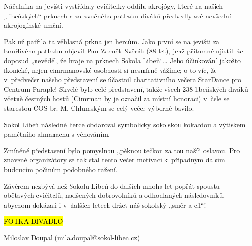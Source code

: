 Náčelníka na jevišti vystřídaly cvičitelky oddílu akrojógy, které na
našich „libeňských`` prknech a za zvučného potlesku diváků předvedly své
nevšední akrojogínské umění.

Pak už patřila ta věhlasná prkna jen hercům. Jako první se na jevišti za
bouřlivého potlesku objevil Pan Zdeněk Svěrák (88 let), jenž přítomné
ujistil, že doposud „nevěděl, že hraje na prknech Sokola Libeň``\ldots{}
Jeho účinkování jakožto ikonické, nejen cimrmanovské osobnosti si
nesmírně vážíme; o to víc, že v~předvečer našeho představení se účastnil
charitativního večera StarDance pro Centrum Paraple! Skvělé bylo celé
představení, takže všech 238 libeňských diváků včetně čestných hostů
(Cimrman by je označil za místní honoraci) v~čele se starostou ČOS br.
M. Chlumským se celý večer výborně bavilo.

Sokol Libeň následně herce obdaroval symbolicky sokolskou kokardou a
výtiskem pamětního almanachu s věnováním.

Zmíněné představení bylo pomyslnou „pěknou tečkou za tou naší`` oslavou.
Pro znavené organizátory se tak stal tento večer motivací k~případným
dalším budoucím počinům podobného ražení.

Závěrem nezbývá než Sokolu Libeň do dalších mnoha let popřát spoustu
obětavých cvičitelů, nadšených dobrovolníků a odhodlaných následovníků,
abychom dokázali i v~dalších letech držet náš sokolský „směr a cíl``!

\hl{FOTKA DIVADLO}

Miloslav Doupal (mila.doupal@sokol-liben.cz)
